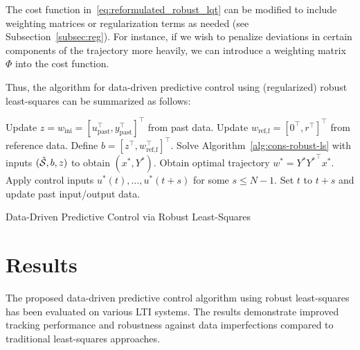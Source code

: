 \begin{Note}
    The cost function in~\eqref{eq:reformulated_robust_lqt} can be modified to include weighting matrices or regularization terms as needed (see Subsection~\ref{subsec:reg}). For instance, if we wish to penalize deviations in certain components of the trajectory more heavily, we can introduce a weighting matrix $\Phi$ into the cost function.
\end{Note}

Thus, the algorithm for data-driven predictive control using (regularized) robust least-squares can be summarized as follows:

\begin{algorithm}[H]
    \BlankLine{} {
        Update $z = w_{\textrm{ini}} = [u_{\textrm{past}}^\top, y_{\textrm{past}}^\top]^\top$ from past data.\;
        Update $w_{\textrm{ref,f}} = [0^\top, r^\top]^\top$ from reference data.\;
        Define $b = [z^\top, w_{\textrm{ref,f}}^\top]^\top$.\;
        Solve Algorithm~\ref{alg:cons-robust-ls} with inputs $(\hat{\mathcal{S}}, b, z)$ to obtain $(x^*,Y^*)$.\;
        Obtain optimal trajectory $w^* = Y^* {Y^*}^\top x^*$.\;
        Apply control inputs $u^*(t), \ldots, u^*(t+s)$ for some $s \leq N-1$.\;
        Set $t$ to $t+s$ and update past input/output data.\;
    }
    \caption{Data-Driven Predictive Control via Robust Least-Squares}
\end{algorithm}

\section{Results}
The proposed data-driven predictive control algorithm using robust least-squares has been evaluated on various LTI systems. The results demonstrate improved tracking performance and robustness against data imperfections compared to traditional least-squares approaches. 

